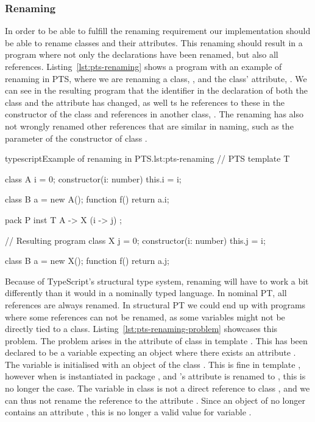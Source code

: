 \subsubsection{Renaming}\label{subsubsec:pts-renaming}

In order to be able to fulfill the renaming requirement our implementation should be able to rename classes and their attributes.
This renaming should result in a program where not only the declarations have been renamed, but also all references.
Listing~\vref{lst:pts-renaming} shows a program with an example of renaming in PTS, where we are renaming a class, , and the class' attribute, .
We can see in the resulting program that the identifier in the declaration of both the class and the attribute has changed, as well ts he references to these in the constructor of the class and references in another class, \@.
The renaming has also not wrongly renamed other references that are similar in naming, such as the parameter of the constructor of class \@.

\begin{code}{typescript}{Example of renaming in PTS.}{lst:pts-renaming}
    // PTS
    template T {
        class A {
            i = 0;
            constructor(i: number) {
                this.i = i;
            }
        }

        class B {
            a = new A();
            function f() {
                return a.i;
            }
        }
    }

    pack P {
        inst T { A -> X (i -> j) };
    }

    // Resulting program
    class X {
        j = 0;
        constructor(i: number) {
            this.j = i;
        }
    }

    class B {
        a = new X();
        function f() {
            return a.j;
        }
    }
\end{code}

Because of TypeScript's structural type system, renaming will have to work a bit differently than it would in a nominally typed language.
In nominal PT, all references are always renamed.
In structural PT we could end up with programs where some references can not be renamed, as some variables might not be directly tied to a class.
Listing~\vref{lst:pts-renaming-problem} showcases this problem.
The problem arises in the  attribute of class  in template .
This has been declared to be a variable expecting an object where there exists an attribute .
The variable  is initialised with an object of the class .
This is fine in template , however when  is instantiated in package , and 's attribute  is renamed to , this is no longer the case.
The  variable in class  is not a direct reference to class , and we can thus not rename the reference to the attribute .
Since an object of  no longer contains an attribute , this is no longer a valid value for variable .




